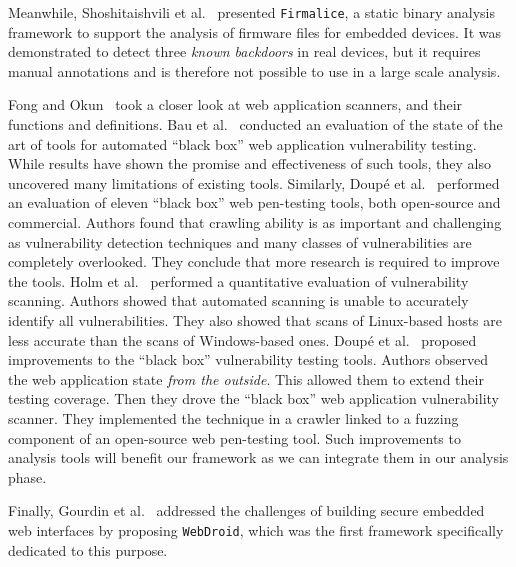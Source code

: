 \documentclass[conference]{./templates/ndss/IEEEtran}
\newcounter{t0d0_counter}
\newcounter{pr00f_counter}
\begin{document}
Meanwhile, Shoshitaishvili et al.~\cite{firmalice2015ndss} presented
\texttt{Firmalice}, a static binary
analysis framework to support the analysis of firmware files for
embedded devices. It was demonstrated to detect three \emph{known
  backdoors} in real devices, but it requires manual annotations and
is therefore not possible to use in a large scale analysis.














Fong and Okun~\cite{fong2007web} took a closer look at web application 
scanners, and their functions and definitions. Bau et al.~\cite{elie-sp2010-AutoBlackBoxWebTest} conducted an evaluation 
of the state of the art of tools for automated ``black box'' web application 
vulnerability testing. While results have shown the promise and effectiveness 
of such tools, they also uncovered many limitations of existing tools. 
Similarly, Doup\'e et al.~\cite{doupe2010johnny} performed an evaluation 
of eleven ``black box'' web pen-testing tools, both open-source and commercial. 
Authors found that crawling ability is as important and challenging as 
vulnerability detection techniques and many classes of vulnerabilities 
are completely overlooked. They conclude that more research is required 
to improve the tools. 
Holm et al.~\cite{holm2011quantitative} performed a quantitative evaluation 
of vulnerability scanning. Authors showed that automated scanning is unable 
to accurately identify all vulnerabilities. They also showed that scans of 
Linux-based hosts are less accurate than the scans of Windows-based ones. 
Doup\'e et al.~\cite{doupe2012enemy} proposed improvements to the ``black box'' 
vulnerability testing tools. Authors observed the web application state 
\emph{from the outside}. This allowed them to extend their testing coverage. 
Then they drove the ``black box'' web application vulnerability scanner. 
They implemented the technique in a crawler linked to a fuzzing 
component of an open-source web pen-testing tool. 
Such improvements to analysis tools will benefit our framework as we can 
integrate them in our analysis phase. 

Finally, Gourdin et al.~\cite{elie-usenix2011-SecEmbWebInterf}
addressed the challenges of building secure embedded web interfaces by
proposing \texttt{WebDroid}, which was the first framework
specifically dedicated to this purpose.
\end{document}
